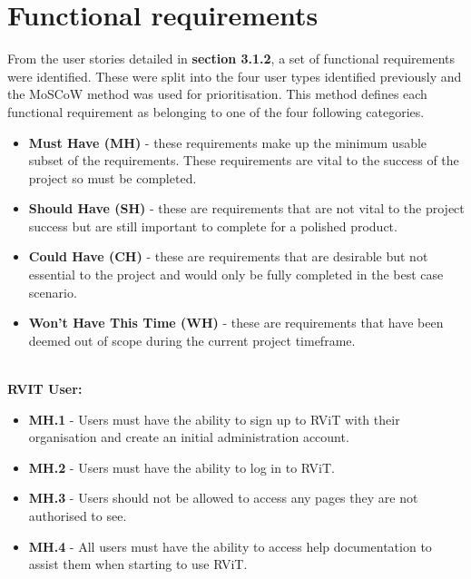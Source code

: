 \documentclass[l4proj.tex]{subfiles}
\begin{document}
\section{Functional requirements}
From the user stories detailed in \textbf{section 3.1.2}, a set of functional requirements were identified. These were split into the four user types identified previously and the MoSCoW method \cite{Consort14} was used for prioritisation. This method defines each functional requirement as belonging to one of the four following categories.
\begin{itemize}
    \item \textbf{Must Have (MH)} - these requirements make up the minimum usable subset of the requirements. These requirements are vital to the success of the project so must be completed.
    \item \textbf{Should Have (SH)} - these are requirements that are not vital to the project success but are still important to complete for a polished product.
    \item \textbf{Could Have (CH)} - these are requirements that are desirable but not essential to the project and would only be fully completed in the best case scenario. 
    \item \textbf{Won't Have This Time (WH)} - these are requirements that have been deemed out of scope during the current project timeframe.
\end{itemize}
\hfill

\hfill\\
\textbf{RVIT User:}
\begin{itemize}
    \item \textbf{MH.1} - Users must have the ability to sign up to RViT with their organisation and create an initial administration account.
    \item \textbf{MH.2} - Users must have the ability to log in to RViT.
    \item \textbf{MH.3} - Users should not be allowed to access any pages they are not authorised to see.
    \item \textbf{MH.4} - All users must have the ability to access help documentation to assist them when starting to use RViT.
\end{itemize}
\hfill
 
\end{document}
